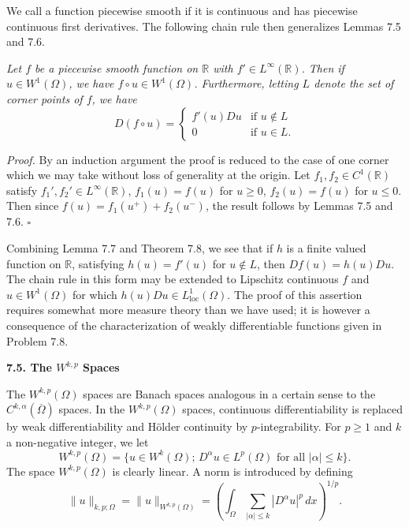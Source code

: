We call a function piecewise smooth if it is continuous and has piecewise continuous first derivatives. The following chain rule then generalizes Lemmas 7.5 and 7.6.

\begin{theorem}\label{gt:thm-sobolev-piecewise-chain-rule}
\emph{Let $f$ be a piecewise smooth function on $\mathbb{R}$ with $f' \in L^\infty(\mathbb{R})$. Then if $u \in W^{1}(\Omega)$, we have $f \circ u \in W^{1}(\Omega)$. Furthermore, letting $L$ denote the set of corner points of $f$, we have}
\begin{equation}
\tag{7.21}
D(f \circ u)=
\begin{cases}
f'(u)Du & \text{if } u \notin L \\
0 & \text{if } u \in L.
\end{cases}
\end{equation}

\emph{Proof.} By an induction argument the proof is reduced to the case of one corner which we may take without loss of generality at the origin. Let $f_1,f_2 \in C^{1}(\mathbb{R})$ satisfy $f_1',f_2' \in L^\infty(\mathbb{R})$, $f_1(u)=f(u)$ for $u \ge 0$, $f_2(u)=f(u)$ for $u \le 0$. Then since $f(u)=f_1(u^+)+f_2(u^-)$, the result follows by Lemmas 7.5 and 7.6. \hfill $\square$

Combining Lemma 7.7 and Theorem 7.8, we see that if $h$ is a finite valued function on $\mathbb{R}$, satisfying $h(u)=f'(u)$ for $u \notin L$, then $Df(u)=h(u)Du$. The chain rule in this form may be extended to Lipschitz continuous $f$ and $u \in W^{1}(\Omega)$ for which $h(u)Du \in L^1_{\mathrm{loc}}(\Omega)$. The proof of this assertion requires somewhat more measure theory than we have used; it is however a consequence of the characterization of weakly differentiable functions given in Problem 7.8.

\end{theorem}

\noindent\textbf{7.5. The $W^{k,p}$ Spaces}\label{gt:sec-wkp-spaces}

The $W^{k,p}(\Omega)$ spaces are Banach spaces analogous in a certain sense to the $C^{k,\alpha}(\overline{\Omega})$ spaces. In the $W^{k,p}(\Omega)$ spaces, continuous differentiability is replaced by weak differentiability and H\"older continuity by $p$-integrability. For $p \geq 1$ and $k$ a non-negative integer, we let
\[
W^{k,p}(\Omega)=\{u \in W^{k}(\Omega);\, D^\alpha u \in L^p(\Omega) \text{ for all } |\alpha| \leq k\}.
\]
The space $W^{k,p}(\Omega)$ is clearly linear. A norm is introduced by defining
\begin{equation}
\tag{7.22}
\|u\|_{k,p;\Omega}=\|u\|_{W^{k,p}(\Omega)}=
\left(\int_\Omega \sum_{|\alpha|\leq k} |D^\alpha u|^p\,dx\right)^{1/p}.
\end{equation}

